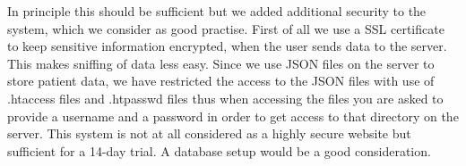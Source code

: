 In principle this should be sufficient but we added additional security to the system, which we consider as good practise. First of all we use a SSL certificate to keep sensitive information encrypted, when the user sends data to the server. This makes sniffing of data less easy. Since we use JSON files on the server to store patient data, we have restricted the access to the JSON files with use of .htaccess files and .htpasswd files thus when accessing the files you are asked to provide a username and a password in order to get access to that directory on the server. This system is not at all considered as a highly secure website but sufficient for a 14-day trial. A database setup would be a good consideration.

